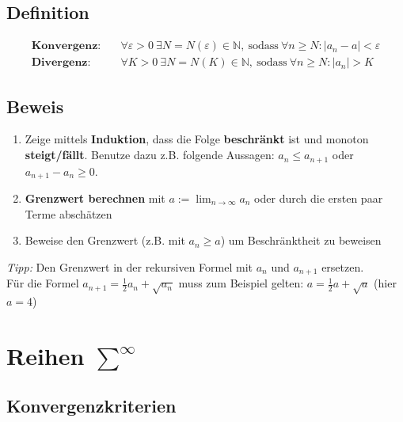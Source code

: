 \subsection{Definition}

\begin{equation*}
\begin{split}
	\textbf{Konvergenz:} \quad & \forall \varepsilon > 0\ \exists N = N(\varepsilon) \in \mathbb{N},\ \text{sodass}\ \forall n \geq N: |a_n - a| < \varepsilon \\
	\textbf{Divergenz:} \quad & \forall K > 0\ \exists N = N(K) \in \mathbb{N},\ \text{sodass}\ \forall n \geq N: |a_n| > K
\end{split}
\end{equation*}

\subsection{Beweis}

\begin{enumerate}[noitemsep]
	\item Zeige mittels \textbf{Induktion}, dass die Folge \textbf{beschr{\"a}nkt} ist und monoton \textbf{steigt/f{\"a}llt}. Benutze dazu z.B. folgende Aussagen: $a_n \leq a_{n+1}$ oder $a_{n+1}-a_n \geq 0$.
	\item \textbf{Grenzwert berechnen} mit $a := \lim_{n \to \infty} a_n$ oder durch die ersten paar Terme absch{\"a}tzen
	\item Beweise den Grenzwert (z.B. mit $a_n \geq a$) um Beschr{\"a}nktheit zu beweisen
\end{enumerate}

\emph{Tipp:} Den Grenzwert in der rekursiven Formel mit $a_n$ und $a_{n+1}$ ersetzen. \\
F{\"u}r die Formel $a_{n+1} = \frac{1}{2}a_n + \sqrt{a_n}$ muss zum Beispiel gelten: $a = \frac{1}{2}a + \sqrt{a}$ (hier $a = 4$)

\section{Reihen $\sum^\infty$}

\subsection{Konvergenzkriterien}

